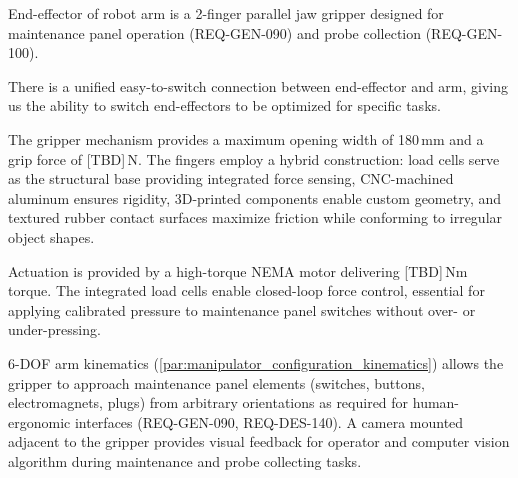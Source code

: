 

End-effector of robot arm is a 2-finger parallel jaw gripper designed for maintenance
panel operation (REQ-GEN-090) and probe collection (REQ-GEN-100).

There is a unified easy-to-switch connection between end-effector and arm,
giving us the ability to switch end-effectors to be optimized for specific tasks.

The gripper mechanism provides a maximum opening width of 180\,mm and a
grip force of [TBD]\,N. The fingers employ a hybrid construction:
load cells serve as the structural base providing integrated force sensing,
CNC-machined aluminum ensures rigidity, 3D-printed components enable custom geometry,
and textured rubber contact surfaces maximize friction while
conforming to irregular object shapes.

Actuation is provided by a high-torque NEMA motor
delivering [TBD]\,Nm torque. The integrated load cells enable closed-loop
force control, essential for applying calibrated pressure to maintenance panel
switches without over- or under-pressing.

6-DOF arm kinematics (\autoref{par:manipulator_configuration_kinematics}) allows the gripper to approach
maintenance panel elements (switches, buttons, electromagnets, plugs)
from arbitrary orientations as required for human-ergonomic interfaces
(REQ-GEN-090, REQ-DES-140). A camera mounted adjacent to the gripper provides
visual feedback for operator and computer vision algorithm during maintenance
and probe collecting tasks.

